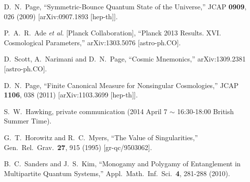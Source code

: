 \documentclass[12pt]{article}
\begin{document}
\begin{thebibliography}{99}
  D.~N.~Page,
  ``Symmetric-Bounce Quantum State of the Universe,''
  JCAP {\bf 0909}, 026 (2009)
  [arXiv:0907.1893 [hep-th]].

  P.~A.~R.~Ade {\it et al.}  [Planck Collaboration],
  ``Planck 2013 Results. XVI. Cosmological Parameters,''
  arXiv:1303.5076 [astro-ph.CO].
  
  D.~Scott, A.~Narimani and D.~N.~Page,
  ``Cosmic Mnemonics,''
  arXiv:1309.2381 [astro-ph.CO].

  D.~N.~Page,
  ``Finite Canonical Measure for Nonsingular Cosmologies,''
  JCAP {\bf 1106}, 038 (2011)
  [arXiv:1103.3699 [hep-th]].
  
  S.~W.~Hawking, private communication (2014 April 7 $\sim$ 16:30-18:00 British Summer Time).

  G.~T.~Horowitz and R.~C.~Myers,
  ``The Value of Singularities,''
  Gen.\ Rel.\ Grav.\  {\bf 27}, 915 (1995)
  [gr-qc/9503062].

  B.~C.~Sanders and J.~S.~Kim, 
  ``Monogamy and Polygamy of Entanglement in Multipartite Quantum Systems,'' 
  Appl.\ Math.\ Inf.\ Sci.\ {\bf 4}, 281-288 (2010).

\end{thebibliography}
\end{document}
